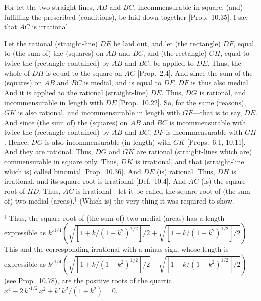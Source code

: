 \begin{Parallel}{}{}
{\epsfysize=2.2in
\centerline{}

For let the two straight-lines, $AB$ and $BC$,  incommensurable
in square,  (and) fulfilling the prescribed (conditions), be laid down together
[Prop.~10.35]. I say that $AC$ is irrational.

Let the rational (straight-line) $DE$ be laid out, and let (the rectangle) $DF$,
equal to (the sum of) the (squares) on $AB$ and $BC$, and (the rectangle) $GH$, equal to twice the (rectangle contained) by
$AB$ and $BC$, be applied
to $DE$. Thus, the whole of $DH$ is equal to the square on $AC$
[Prop.~2.4]. And since the sum of the (squares)
on $AB$ and $BC$ is medial, and is equal to $DF$, $DF$ is thus also
medial. And it is applied to the rational (straight-line) $DE$. 
Thus, $DG$ is rational, and incommensurable in length with $DE$ [Prop.~10.22]. So, for the same (reasons), $GK$
is also rational, and incommensurable in length with $GF$---that is
to say, $DE$. And since (the sum of) the (squares) on $AB$ and $BC$
is incommensurable with twice the (rectangle contained) by $AB$ and
$BC$, $DF$ is incommensurable with $GH$.
Hence, $DG$ is also incommensurable (in length)
with $GK$ [Props.~6.1, 10.11]. And they are rational. Thus, $DG$ and
$GK$ are rational (straight-lines which are) commensurable in square only. Thus, $DK$ is irrational, and that (straight-line which is) called binomial 
[Prop.~10.36]. And $DE$ (is) rational.
Thus, $DH$ is irrational, and its square-root is irrational [Def.~10.4]. And $AC$ (is) the square-root of $HD$. Thus,
$AC$ is irrational---let it be called the square-root of (the sum of) two medial
(areas).$^\dag$ (Which is) the very thing it was required to show.}
\end{Parallel}
{\footnotesize\noindent$^\dag$ Thus, the square-root
of (the sum of) two medial (areas)
has a length expressible as $k'^{1/4}\left(\sqrt{[1+k/(1+k^2)^{1/2}]/2}
+\sqrt{[1-k/(1+k^2)^{1/2}]/2}\right)$. This  and the corresponding irrational with a minus sign, whose length is expressible as $k'^{1/4}\left(\sqrt{[1+k/(1+k^2)^{1/2}]/2}
-\sqrt{[1-k/(1+k^2)^{1/2}]/2}\right)$
 (see Prop.~10.78), are
the positive roots of the quartic $x^4-2\,k'^{1/2}\,x^2+ k'\, k^2/(1+k^2)= 0$.} 

